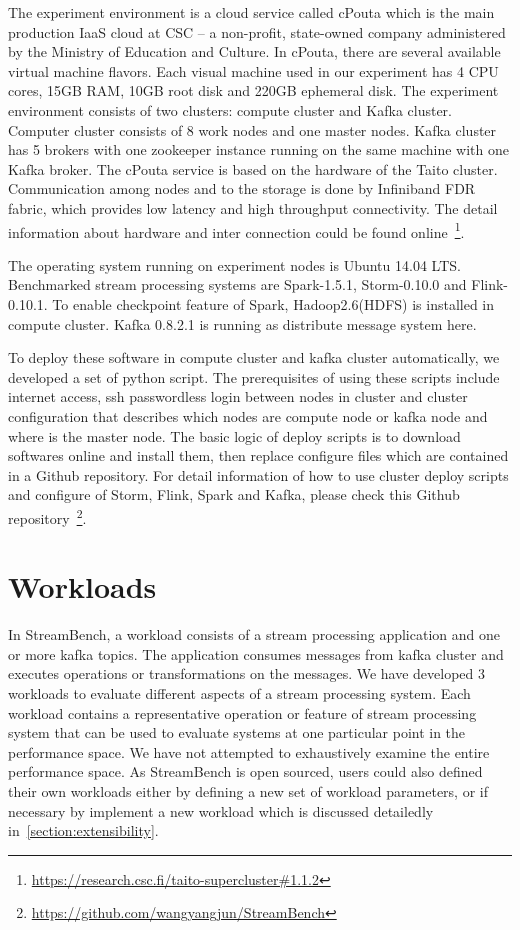 The experiment environment is a cloud service called cPouta which is the main production IaaS cloud at CSC -- a non-profit, state-owned company administered by the Ministry of Education and Culture. In cPouta,  there are several available virtual machine flavors. Each visual machine used in our experiment has 4 CPU cores, 15GB RAM, 10GB root disk and 220GB ephemeral disk. The experiment environment consists of two clusters: compute cluster and Kafka cluster. Computer cluster consists of 8 work nodes and one master nodes. Kafka cluster has 5 brokers with one zookeeper instance running on the same machine with one Kafka broker. The cPouta service is based on the hardware of the Taito cluster. Communication among nodes and to the storage is done by Infiniband FDR fabric, which provides low latency and high throughput connectivity. The detail information about hardware and inter connection could be found online~\footnote{\url{https://research.csc.fi/taito-supercluster\#1.1.2}}.

The operating system running on experiment nodes is Ubuntu 14.04 LTS. Benchmarked stream processing systems are Spark-1.5.1, Storm-0.10.0 and Flink-0.10.1. To enable checkpoint feature of Spark, Hadoop2.6(HDFS) is installed in compute cluster. Kafka 0.8.2.1 is running as distribute message system here. 

To deploy these software in compute cluster and kafka cluster automatically, we developed a set of python script. The prerequisites of using these scripts include internet access, ssh passwordless login between nodes in cluster and cluster configuration that describes which nodes are compute node or kafka node and where is the master node. The basic logic of deploy scripts is to download softwares online and install them, then replace configure files which are contained in a Github repository. For detail information of how to use cluster deploy scripts and configure of Storm, Flink, Spark and Kafka, please check this Github repository~\footnote{\url{https://github.com/wangyangjun/StreamBench}}.

\section{Workloads}
\label{section:workloads}

In StreamBench, a workload consists of a stream processing application and one or more kafka topics. The application consumes messages from kafka cluster and executes operations or transformations on the messages. We have developed 3 workloads to evaluate different aspects of a stream processing system. Each workload contains a representative operation or feature of stream processing system that can be used to evaluate systems at one particular point in the performance space. We have not attempted to exhaustively examine the entire performance space. As StreamBench is open sourced, users could also defined their own workloads either by defining a new set of workload parameters, or if necessary by implement a new workload which is discussed detailedly in~\cref{section:extensibility}.


